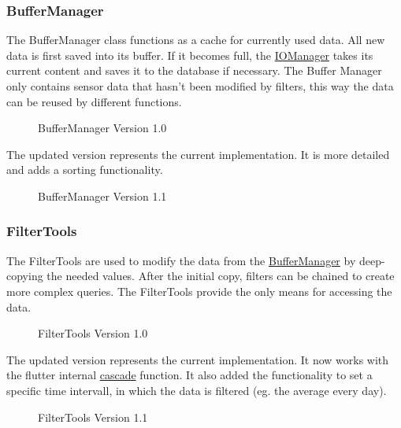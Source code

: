 \documentclass[12pt]{article}
\newcounter{fr}
\begin{document}
\subsubsection{BufferManager}
\label{sec:BufferManager}
The BufferManager class functions as a cache for currently used data. All new data is first saved into its buffer. If it becomes full, the \hyperref[sec:IOManager]{IOManager} takes its current content and saves it to the database if necessary. The Buffer Manager only contains sensor data that hasn't been modified by filters, this way the data can be reused by different functions.
\begin{figure}[ht]
\centering

\caption{\label{fig:bild9} BufferManager Version 1.0}
\end{figure}
\newpage

The updated version represents the current implementation. It is more detailed and adds a sorting functionality.

\begin{figure}[ht]
\centering

\caption{\label{fig:bild10} BufferManager Version 1.1}
\end{figure}


\subsubsection{FilterTools}
\label{sec:FilterTools}
The FilterTools are used to modify the data from the \hyperref[sec:BufferManger]{BufferManager} by deep-copying the needed values. After the initial copy, filters can be chained to create more complex queries. The FilterTools provide the only means for accessing the data.
\begin{figure}[ht]
\centering

\caption{\label{fig:bild11} FilterTools Version 1.0}
\end{figure}
\newpage

The updated version represents the current implementation. It now works with the flutter internal \hyperlink{https://flutterbyexample.com/lesson/cascade-notation}{cascade} function. It also added the functionality to set a specific time intervall, in which the data is filtered (eg. the average every day). 
\begin{figure}[ht]
\centering

\caption{\label{fig:bild12} FilterTools Version 1.1}
\end{figure}
\end{document}
